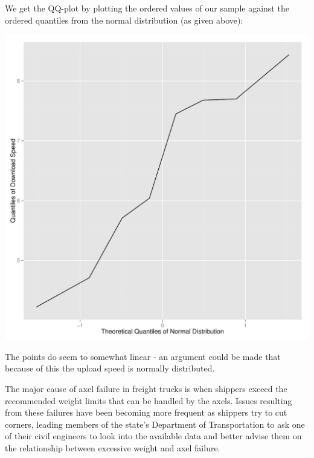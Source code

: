 \documentclass{examsetup}\usepackage[]{graphicx}\usepackage[]{color}
\newenvironment{knitrout}{}{} %
\begin{document}
\begin{questions}
\begin{parts}
\begin{solution}
   We get the QQ-plot by plotting the ordered values of our sample against the ordered quantiles from the normal distribution (as given above): \\

\begin{centering}
\begin{knitrout}
\color{fgcolor}
\includegraphics[width=.8\linewidth]{figure/unnamed-chunk-10-1} 

\end{knitrout}
\end{centering}

The points do seem to somewhat linear - an argument could be made that because of this the upload speed is normally distributed.

\end{solution}

\end{parts}
\pagebreak

\question

The major cause of axel failure in freight trucks is when shippers exceed the recommended weight limits that can be handled by the axels. 
Issues resulting from these failures have been becoming more frequent as shippers try to cut corners, 
leading members of the state's Department of Transportation to ask one of their civil engineers 
to look into the available data and better advise them on the relationship between excessive weight and axel failure.


\end{questions}
\end{document}
